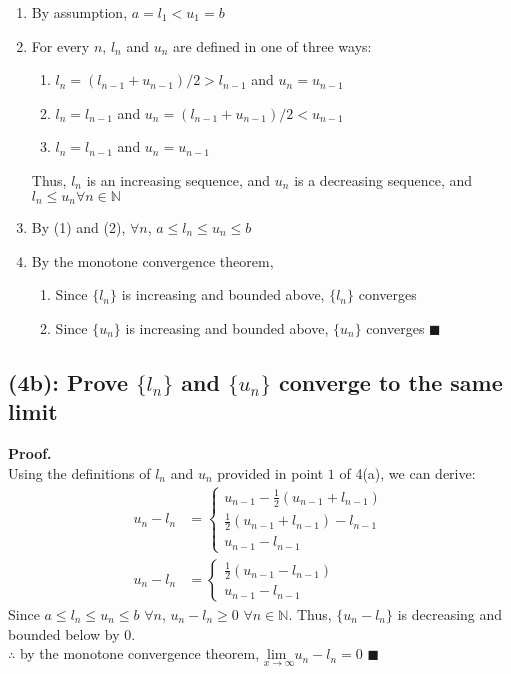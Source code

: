 \documentclass{article}
\newcommand{\N}{\mathbb{N}}
\newcommand{\lmt}{\underset{x\rightarrow\infty}{\text{lim }}}
\begin{document}
\begin{enumerate}
	\item By assumption, $a=l_1<u_1=b$
	
	\item For every $n$, $l_n$ and $u_n$ are defined in one of three ways:
	\begin{enumerate}
		\item $l_n=(l_{n-1}+u_{n-1})/2>l_{n-1}$ and $u_n=u_{n-1}$
		\item $l_n=l_{n-1}$ and $u_n=(l_{n-1}+u_{n-1})/2<u_{n-1}$
		\item $l_n=l_{n-1}$ and $u_n=u_{n-1}$
	\end{enumerate}
	Thus, $l_n$ is an increasing sequence, and $u_n$ is a decreasing sequence, and $l_n\leq u_n\forall n\in\N$
	
	\item By (1) and (2), $\forall n$, $a\leq l_n\leq u_n\leq b$
	
	\item By the monotone convergence theorem,
	\begin{enumerate}
		\item Since $\{l_n\}$ is increasing and bounded above, $\{l_n\}$ converges
		\item Since $\{u_n\}$ is increasing and bounded above, $\{u_n\}$ converges $\blacksquare$
	\end{enumerate}
\end{enumerate}


\subsection*{(4b): Prove $\{l_n\}$ and $\{u_n\}$ converge to the same limit}

\textbf{Proof.}
\medskip \\
Using the definitions of $l_n$ and $u_n$ provided in point $1$ of 4(a), we can derive:
\begin{align*}
	u_n-l_n &= 
	\begin{cases}
		u_{n-1} - \frac{1}{2}(u_{n-1}+l_{n-1})	\\
		\frac{1}{2}(u_{n-1}+l_{n-1}) - l_{n-1}	\\
		u_{n-1}-l_{n-1}
	\end{cases} \\
	u_n-l_n &= 
	\begin{cases}
		\frac{1}{2}(u_{n-1} - l_{n-1})	\\
		u_{n-1}-l_{n-1}
	\end{cases}	
\end{align*}	
Since $a\leq l_n\leq u_n\leq b$ $\forall n$, $u_n-l_n\geq0$ $\forall n\in\N$. Thus, $\{u_n-l_n\}$ is decreasing and bounded below by $0$. \\
 $\therefore$ by the monotone convergence theorem, $\lmt u_n-l_n = 0$ $\blacksquare$
\end{document}
